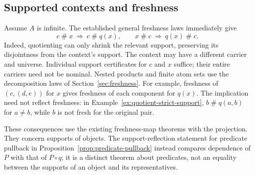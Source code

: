 \subsection{Supported contexts and freshness}

Assume $A$ is infinite. The established general freshness laws immediately
give
\[
  c\mathrel{\#}x\ \Longrightarrow\ c\mathrel{\#}q(x),\qquad
  x\mathrel{\#}c\ \Longrightarrow\ q(x)\mathrel{\#}c.
\]
Indeed, quotienting can only shrink the relevant support, preserving its
disjointness from the context's support. The context may have a different
carrier and universe. Individual support certificates for $c$ and $x$
suffice; their entire carriers need not be nominal. Nested products and
finite atom sets use the decomposition laws of Section~\ref{sec:freshness}.
For example, freshness of $(c,(d,e))$ for $x$ gives freshness of each
component for $q(x)$.
The implication need not reflect freshness: in
Example~\ref{ex:quotient-strict-support}, $b\mathrel{\#}q(a,b)$ for
$a\ne b$, while $b$ is not fresh for the original pair.

These consequences use the existing freshness-map theorems with the
projection. They concern supports of objects. The support-reflection statement
for predicate pullback in Proposition~\ref{prop:predicate-pullback} instead
compares dependence of $P$ with that of $P\circ q$; it is a distinct theorem
about predicates, not an equality between the supports of an object and its
representatives.
